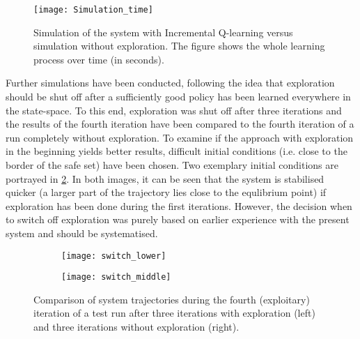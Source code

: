 \documentclass[../main.tex]{subfiles}
\begin{document}
\begin{figure}
    \centering
    \texttt{[image: Simulation\_time]}
        \caption{Simulation of the system with Incremental Q-learning versus simulation without exploration. The figure shows the whole learning process over time (in seconds).}\label{fig:Simulation_time}
\end{figure}
Further simulations have been conducted, following the idea that exploration should be shut off after a sufficiently good policy has been learned everywhere in the state-space. To this end, exploration was shut off after three iterations and the results of the fourth iteration have been compared to the fourth iteration of a run completely without exploration. To examine if the approach with exploration in the beginning yields better results, difficult initial conditions (i.e. close to the border of the safe set) have been chosen. Two exemplary initial conditions are portrayed in \ref{fig:Simulation_shutoff}. In both images, it can be seen that the system is stabilised quicker (a larger part of the trajectory lies close to the equlibrium point) if exploration has been done during the first iterations. However, the decision when to switch off exploration was purely based on earlier experience with the present system and should be systematised.

\begin{figure}[H]
    \centering
    \begin{subfigure}[b]{\textwidth}
    \texttt{[image: switch\_lower]}
    \end{subfigure}
    
    \begin{subfigure}[b]{\textwidth}
    \texttt{[image: switch\_middle]}
    \end{subfigure}
        \caption{Comparison of system trajectories during the fourth (exploitary) iteration of a test run after three iterations with exploration (left) and three iterations without exploration (right).}  \label{fig:Simulation_shutoff}
\end{figure}
\end{document}
